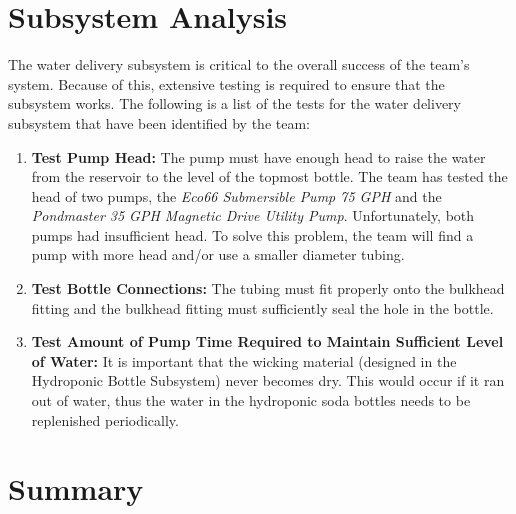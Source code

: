 \documentclass[12pt]{article}
\begin{document}
\section{Subsystem Analysis}


The water delivery subsystem is critical to the overall success of the team's system. Because of
this, extensive testing is required to ensure that the subsystem works. The following is a list of
the tests for the water delivery subsystem that have been identified by the team:

\begin{enumerate}

    \item \textbf{Test Pump Head:} The pump must have enough head to raise the water from the
        reservoir to the level of the topmost bottle. The team has tested the head of two pumps, the
        \textit{Eco66 Submersible Pump 75 GPH} and the \textit{Pondmaster 35 GPH Magnetic Drive
        Utility Pump}. Unfortunately, both pumps had insufficient head. To solve this problem, the
        team will find a pump with more head and/or use a smaller diameter tubing.

    \item \textbf{Test Bottle Connections:} The tubing must fit properly onto the bulkhead fitting
        and the bulkhead fitting must sufficiently seal the hole in the bottle.

    \item \textbf{Test Amount of Pump Time Required to Maintain Sufficient Level of Water:} It is
        important that the wicking material (designed in the Hydroponic Bottle Subsystem) never
        becomes dry. This would occur if it ran out of water, thus the water in the hydroponic soda
        bottles needs to be replenished periodically.

\end{enumerate}

\section{Summary}



\end{document}
